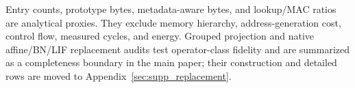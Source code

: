 Entry counts, prototype bytes, metadata-aware bytes, and lookup/MAC ratios are
analytical proxies. They exclude memory hierarchy, address-generation cost,
control flow, measured cycles, and energy. Grouped projection and native
affine/BN/LIF replacement audits test operator-class fidelity and are summarized
as a completeness boundary in the main paper; their construction and detailed
rows are moved to Appendix~\ref{sec:supp_replacement}.
